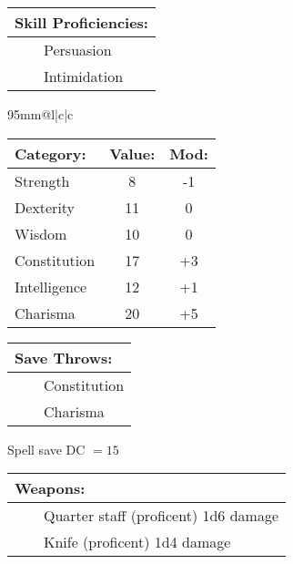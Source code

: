 \documentclass[11pt]{article}
\newcommand{\tabitem}{~~\llap{--}~~}
\begin{document}
\begin{multicols}{2}
\vspace{2mm}

\noindent \begin{tabularx}{95mm}{@{}l}
{\Large \textbf{Skill Proficiencies:}} \\
\hline
\tabitem Persuasion \\
\tabitem Intimidation \\
		\end{tabularx}

\vspace{4mm}

\noindent \begin{tabularx}{95mm}{@{}l|c|c}
 \\
\hline
		\end{tabularx}
\noindent \begin{tabular}{@{}l|c|c}
\textbf{Category:} 			& \textbf{Value:} 	& \textbf{Mod:} \\
\hline
Strength 					& 8 				& -1 			\\
Dexterity 					& 11 				& 0 			\\
Wisdom 						& 10				& 0 			\\
Constitution 				& 17 				& +3 			\\
Intelligence 				& 12 				& +1 			\\
Charisma 					& 20 				& +5 			\\
		\end{tabular}

\vspace{4mm}

\noindent \begin{tabularx}{95mm}{@{}l}
{\Large \textbf{Save Throws:}} \\
\hline
\tabitem Constitution \\
\tabitem Charisma \\
		\end{tabularx}
\noindent Spell save DC $= 15$

\vspace{4mm}

\noindent \begin{tabularx}{95mm}{@{}l}
{\Large \textbf{Weapons:}} \\
\hline
\tabitem Quarter staff (proficent) 1d6 damage \\
\tabitem Knife (proficent) 1d4 damage \\
		\end{tabularx}

\vspace{4mm}


\end{multicols}
\end{document}
